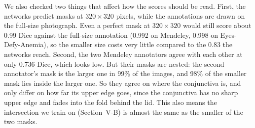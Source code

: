\documentclass[conference]{IEEEtran}
\begin{document}
We also checked two things that affect how the scores should be read. First,
the networks predict masks at $320 \times 320$ pixels, while the annotations
are drawn on the full-size photograph. Even a perfect mask at $320 \times 320$
would still score about 0.99 Dice against the full-size annotation (0.992 on
Mendeley, 0.998 on Eyes-Defy-Anemia), so the smaller size costs very little
compared to the 0.83 the networks reach. Second, the two Mendeley annotators
agree with each other at only 0.736 Dice, which looks low. But their masks are
nested: the second annotator's mask is the larger one in 99\% of the images,
and 98\% of the smaller mask lies inside the larger one. So they agree on where
the conjunctiva is, and only differ on how far its upper edge goes, since the
conjunctiva has no sharp upper edge and fades into the fold behind the lid.
This also means the intersection we train on (Section~V-B) is almost the same
as the smaller of the two masks.
\end{document}
